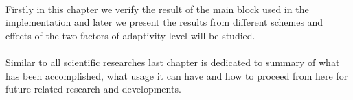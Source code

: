 \\
\noindent  Firstly in this chapter we verify the result of the main block used in the implementation and later we present the results from different schemes and effects of the two factors of adaptivity level will be studied. \\

 \\
\noindent  Similar to all scientific researches last chapter is dedicated to summary of what has been accomplished, what usage it can have and how to proceed from here for future related research and developments.\\
